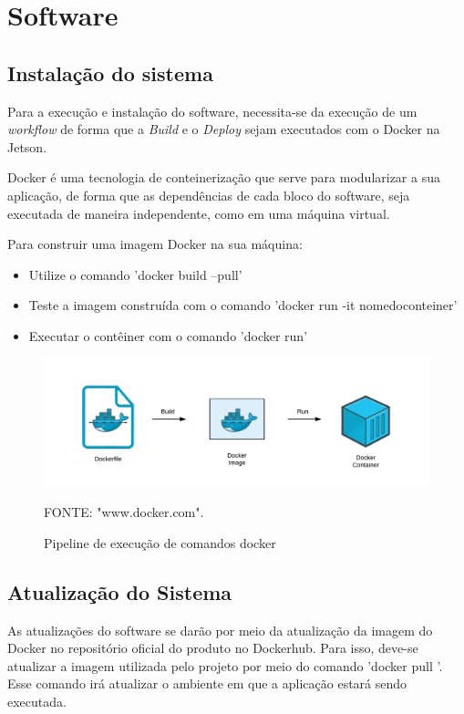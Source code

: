 \chapter{Software}

\section{Instalação do sistema}

Para a execução e instalação do software, necessita-se da execução de um \textit{workflow } de forma que a \textit{Build} e o \textit{Deploy} sejam executados com o Docker na Jetson.

Docker é uma tecnologia de conteinerização que serve para modularizar a sua aplicação, de forma que as dependências de cada bloco do software, seja executada de maneira independente, como em uma máquina virtual. 

Para construir uma imagem Docker na sua máquina:
\begin{itemize}
    \item Utilize o comando 'docker build --pull'
    \item Teste a imagem construída com o comando 'docker run -it nomedoconteiner'
    \item Executar o contêiner com o comando 'docker run'
\end{itemize}

\begin{figure}[H]
  \centering
  \includegraphics[keepaspectratio=true,scale=0.2] {Figuras/Software/dockerfiletocontainer.png}
  \caption{Pipeline de execução de comandos docker} 
 { \footnotesize FONTE: "www.docker.com".} 
  \label{fig:docker}
\end{figure}

\section{Atualização do Sistema}

As atualizações do software se darão por meio da atualização da imagem do Docker no repositório oficial do produto no Dockerhub. Para isso, deve-se atualizar a imagem utilizada pelo projeto por meio do comando 'docker pull '. Esse comando irá atualizar o ambiente em que a aplicação estará sendo executada.

